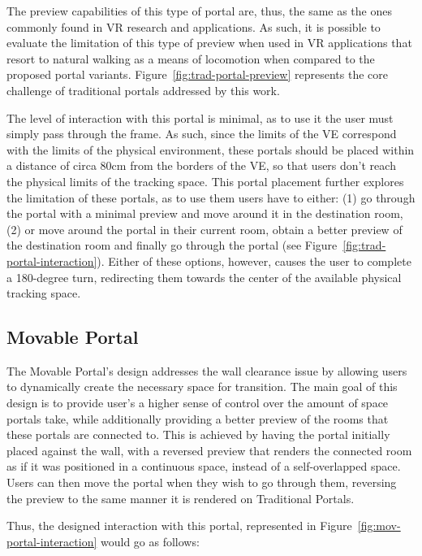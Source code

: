 The preview capabilities of this type of portal are, thus, the same as the ones commonly found in \gls{VR} research and applications. As such, 
it is possible to evaluate the limitation of this type of preview when used in \gls{VR} applications that resort to natural walking as a means 
of locomotion when compared to the proposed portal variants. Figure~\ref{fig:trad-portal-preview} represents the core challenge of traditional portals 
addressed by this work.


The level of interaction with this portal is minimal, as to use it the user must simply pass through the frame. 
As such, since the limits of the \gls{VE} correspond with the limits of the physical environment, these portals should be placed within a 
distance of circa 80cm from the borders of the \gls{VE}, so that users don't reach the physical limits of the tracking space.
This portal placement further explores the limitation of these portals, as to use them users have to either: (1) go through the portal with a 
minimal preview and move around it in the destination room, (2) or move around the portal in their current room, obtain a better preview of the 
destination room and finally go through the portal (see Figure~\ref{fig:trad-portal-interaction}). Either of these options, however, causes the user to complete a 
180-degree turn, redirecting them towards the center of the available physical tracking space.


\subsection{Movable Portal}
\label{sec:mov-portal-design}

The Movable Portal's design addresses the wall clearance issue by allowing users to dynamically create the necessary space for transition. The main 
goal of this design is to provide user's a higher sense of control over the amount of space portals take, while additionally providing a better 
preview of the rooms that these portals are connected to. This is achieved by having the portal initially placed against the wall, with a reversed 
preview that renders the connected room as if it was positioned in a continuous space, instead of a self-overlapped space. Users can then move 
the portal when they wish to go through them, reversing the preview to the same manner it is rendered on Traditional Portals.

Thus, the designed interaction with this portal, represented in Figure~\ref{fig:mov-portal-interaction} would go as follows:

